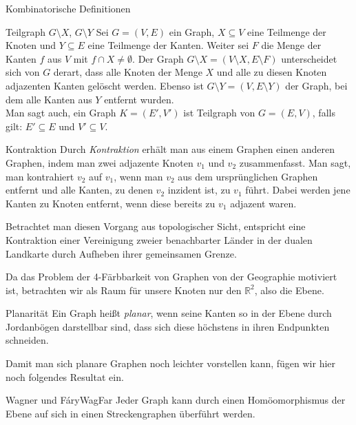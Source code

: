 \begin{section}{Kombinatorische Definitionen}
  \begin{definition}{Teilgraph $G\setminus X$, $G\setminus Y$}
   Sei $G=(V,E)$ ein Graph, $X \subseteq V$ eine Teilmenge der Knoten und $Y \subseteq E$ eine Teilmenge der Kanten. Weiter sei $F$ die Menge der Kanten $f$ aus $V$ mit $f \cap X \neq \emptyset$. Der Graph $G\setminus X = (V\setminus X,E\setminus F)$ unterscheidet sich von $G$ derart, dass alle Knoten der Menge $X$ und alle zu diesen Knoten adjazenten Kanten gelöscht werden. Ebenso ist $G\setminus Y = (V,E\setminus Y)$ der Graph, bei dem alle Kanten aus $Y$ entfernt wurden.\\
   Man sagt auch, ein Graph $K = (E',V')$ ist Teilgraph von $G = (E,V)$, falls gilt: $E' \subseteq E$ und $ V' \subseteq V$. 
  \end{definition}
  
  \begin{definition}{Kontraktion}
   Durch \textit{Kontraktion} erhält man aus einem Graphen einen anderen Graphen, indem man zwei adjazente Knoten $v_1$ und $v_2$ zusammenfasst. Man sagt, man kontrahiert $v_2$ auf $v_1$, wenn man $v_2$ aus dem ursprünglichen Graphen entfernt und alle Kanten, zu denen $v_2$ inzident ist, zu $v_1$ führt. Dabei werden jene Kanten zu Knoten entfernt, wenn diese bereits zu $v_1$ adjazent waren.
  \end{definition}

  Betrachtet man diesen Vorgang aus topologischer Sicht, entspricht eine Kontraktion einer Vereinigung zweier benachbarter Länder in der dualen Landkarte durch Aufheben ihrer gemeinsamen Grenze.
  
  Da das Problem der 4-Färbbarkeit von Graphen von der Geographie motiviert ist, betrachten wir als Raum für unsere Knoten nur den $\mathbb{R}^2$, also die Ebene.
  
  \begin{definition}{Planarität}
   Ein Graph heißt \textit{planar}, wenn seine Kanten so in der Ebene durch Jordanbögen darstellbar sind, dass sich diese höchstens in ihren Endpunkten schneiden.
  \end{definition}
  
  Damit man sich planare Graphen noch leichter vorstellen kann, fügen wir hier noch folgendes Resultat ein.
  
  \begin{satzl}{Wagner und Fáry}{WagFar}
   Jeder Graph kann durch einen Homöomorphismus der Ebene auf sich in einen Streckengraphen überführt werden.
  \end{satzl}
  

\end{section}
